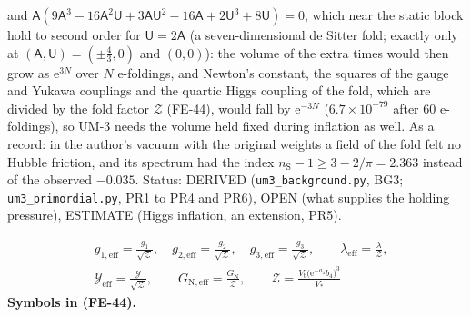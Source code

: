 \documentclass[
  10pt,
]{article}
\begin{document}
and
\(\mathsf{A}(9\mathsf{A}^3 - 16\mathsf{A}^2\mathsf{U} + 3\mathsf{A}\mathsf{U}^2 - 16\mathsf{A} + 2\mathsf{U}^3 + 8\mathsf{U}) = 0\),
which near the static block hold to second order for
\(\mathsf{U} = 2\mathsf{A}\) (a seven-dimensional de Sitter fold;
exactly only at \((\mathsf{A}, \mathsf{U}) = (\pm\frac43, 0)\) and
\((0, 0)\)): the volume of the extra times would then grow as
\(\mathrm{e}^{3N}\) over \(N\) e-foldings, and Newton's constant, the
squares of the gauge and Yukawa couplings and the quartic Higgs coupling
of the fold, which are divided by the fold factor \(\mathcal{Z}\)
(FE-44), would fall by \(\mathrm{e}^{-3N}\) (\(6.7\times10^{-79}\) after
60 e-foldings), so UM-3 needs the volume held fixed during inflation as
well. As a record: in the author's vacuum with the original weights a
field of the fold felt no Hubble friction, and its spectrum had the
index \(n_{\mathrm{S}} - 1 \ge 3 - 2/\pi = 2.363\) instead of the
observed \(-0.035\). Status: DERIVED (\texttt{um3\_background.py}, BG3;
\texttt{um3\_primordial.py}, PR1 to PR4 and PR6), OPEN (what supplies
the holding pressure), ESTIMATE (Higgs inflation, an extension, PR5).

\[
\begin{aligned}
&g_{1,\mathrm{eff}} = \frac{g_1}{\sqrt{\mathcal{Z}}},\quad g_{2,\mathrm{eff}} = \frac{g_2}{\sqrt{\mathcal{Z}}},\quad g_{3,\mathrm{eff}} = \frac{g_3}{\sqrt{\mathcal{Z}}},\qquad \lambda_{\mathrm{eff}} = \frac{\lambda}{\mathcal{Z}},\\
&\mathcal{Y}_{\mathrm{eff}} = \frac{\mathcal{Y}}{\sqrt{\mathcal{Z}}},\qquad G_{\mathrm{N,eff}} = \frac{G_{\mathrm{N}}}{\mathcal{Z}},\qquad
\mathcal{Z} = \frac{V_{\mathrm{t}}\big(\mathrm{e}^{-a_4}b_4\big)^3}{V_*}
\end{aligned} \tag{FE-44}
\] \textbf{Symbols in (FE-44).}
\end{document}
